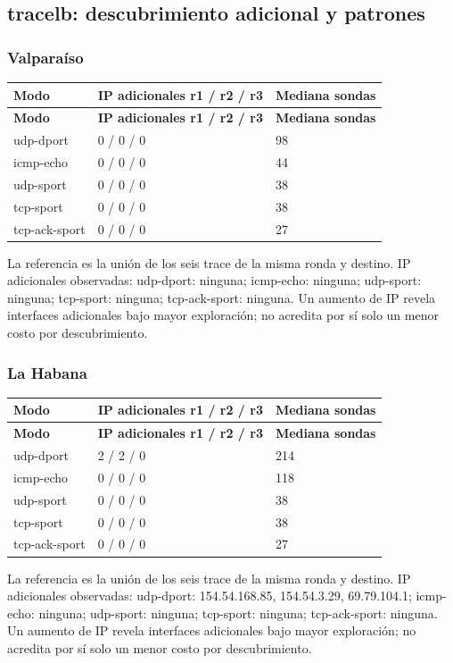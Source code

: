 \subsection{tracelb: descubrimiento adicional y patrones}\label{sec:lb}
\subsubsection{Valparaíso}
\begingroup
\fontsize{9}{11}\selectfont
\addtocounter{table}{-1}
\begin{longtable}{p{3.2cm}p{8cm}p{3cm}}
\toprule
\textbf{Modo} & \textbf{IP adicionales r1 / r2 / r3} & \textbf{Mediana sondas} \\ \midrule
\endfirsthead
\toprule
\textbf{Modo} & \textbf{IP adicionales r1 / r2 / r3} & \textbf{Mediana sondas} \\ \midrule
\endhead
udp-dport & 0 / 0 / 0 & 98 \\
icmp-echo & 0 / 0 / 0 & 44 \\
udp-sport & 0 / 0 / 0 & 38 \\
tcp-sport & 0 / 0 / 0 & 38 \\
tcp-ack-sport & 0 / 0 / 0 & 27 \\
\bottomrule
\end{longtable}
\endgroup
La referencia es la unión de los seis trace de la misma ronda y destino. IP adicionales observadas: udp-dport: ninguna; icmp-echo: ninguna; udp-sport: ninguna; tcp-sport: ninguna; tcp-ack-sport: ninguna. Un aumento de IP revela interfaces adicionales bajo mayor exploración; no acredita por sí solo un menor costo por descubrimiento.

\subsubsection{La Habana}
\begingroup
\fontsize{9}{11}\selectfont
\addtocounter{table}{-1}
\begin{longtable}{p{3.2cm}p{8cm}p{3cm}}
\toprule
\textbf{Modo} & \textbf{IP adicionales r1 / r2 / r3} & \textbf{Mediana sondas} \\ \midrule
\endfirsthead
\toprule
\textbf{Modo} & \textbf{IP adicionales r1 / r2 / r3} & \textbf{Mediana sondas} \\ \midrule
\endhead
udp-dport & 2 / 2 / 0 & 214 \\
icmp-echo & 0 / 0 / 0 & 118 \\
udp-sport & 0 / 0 / 0 & 38 \\
tcp-sport & 0 / 0 / 0 & 38 \\
tcp-ack-sport & 0 / 0 / 0 & 27 \\
\bottomrule
\end{longtable}
\endgroup
La referencia es la unión de los seis trace de la misma ronda y destino. IP adicionales observadas: udp-dport: 154.54.168.85, 154.54.3.29, 69.79.104.1; icmp-echo: ninguna; udp-sport: ninguna; tcp-sport: ninguna; tcp-ack-sport: ninguna. Un aumento de IP revela interfaces adicionales bajo mayor exploración; no acredita por sí solo un menor costo por descubrimiento.

